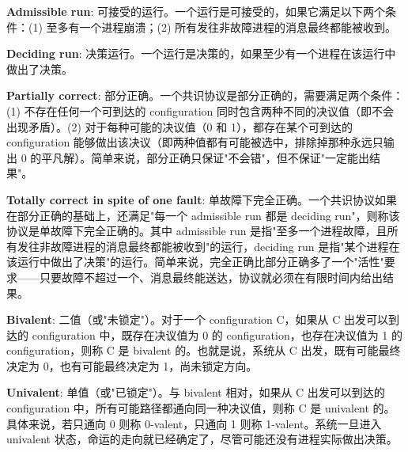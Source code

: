 \documentclass[12pt, a4paper]{ctexart}
\theoremstyle{definition}
\theoremstyle{plain}
\theoremstyle{remark}
\begin{document}
    \textbf{Admissible run}: 可接受的运行。一个运行是可接受的，如果它满足以下两个条件：(1) 至多有一个进程崩溃；(2) 所有发往非故障进程的消息最终都能被收到。

    \textbf{Deciding run}: 决策运行。一个运行是决策的，如果至少有一个进程在该运行中做出了决策。

    \textbf{Partially correct}: 部分正确。一个共识协议是部分正确的，需要满足两个条件：(1) 不存在任何一个可到达的 configuration 同时包含两种不同的决议值（即不会出现矛盾）。(2) 对于每种可能的决议值（0 和 1），都存在某个可到达的 configuration 能够做出该决议（即两种值都有可能被选中，排除掉那种永远只输出 0 的平凡解）。简单来说，部分正确只保证"不会错"，但不保证"一定能出结果"。

    \textbf{Totally correct in spite of one fault}: 单故障下完全正确。一个共识协议如果在部分正确的基础上，还满足"每一个 admissible run 都是 deciding run"，则称该协议是单故障下完全正确的。其中 admissible run 是指"至多一个进程故障，且所有发往非故障进程的消息最终都能被收到"的运行，deciding run 是指"某个进程在该运行中做出了决策"的运行。简单来说，完全正确比部分正确多了一个"活性"要求——只要故障不超过一个、消息最终能送达，协议就必须在有限时间内给出结果。

    \textbf{Bivalent}: 二值（或"未锁定"）。对于一个 configuration C，如果从 C 出发可以到达的 configuration 中，既存在决议值为 0 的 configuration，也存在决议值为 1 的 configuration，则称 C 是 bivalent 的。也就是说，系统从 C 出发，既有可能最终决定为 0，也有可能最终决定为 1，尚未锁定方向。

    \textbf{Univalent}: 单值（或"已锁定"）。与 bivalent 相对，如果从 C 出发可以到达的 configuration 中，所有可能路径都通向同一种决议值，则称 C 是 univalent 的。具体来说，若只通向 0 则称 0-valent，只通向 1 则称 1-valent。系统一旦进入 univalent 状态，命运的走向就已经确定了，尽管可能还没有进程实际做出决策。
\end{document}

